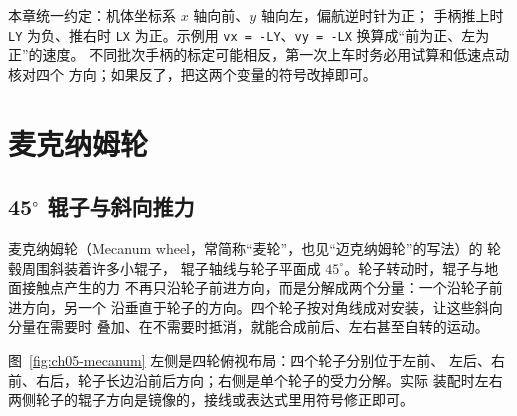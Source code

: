 本章统一约定：机体坐标系 $x$ 轴向前、$y$ 轴向左，偏航逆时针为正；
手柄推上时 \texttt{LY} 为负、推右时 \texttt{LX} 为正。示例用
\texttt{vx = -LY}、\texttt{vy = -LX} 换算成“前为正、左为正”的速度。
不同批次手柄的标定可能相反，第一次上车时务必用试算和低速点动核对四个
方向；如果反了，把这两个变量的符号改掉即可。

\section{麦克纳姆轮}

\subsection{45$^\circ$ 辊子与斜向推力}

麦克纳姆轮（Mecanum wheel，常简称“麦轮”，也见“迈克纳姆轮”的写法）的
轮毂周围斜装着许多小辊子，
辊子轴线与轮子平面成 $45^\circ$。轮子转动时，辊子与地面接触点产生的力
不再只沿轮子前进方向，而是分解成两个分量：一个沿轮子前进方向，另一个
沿垂直于轮子的方向。四个轮子按对角线成对安装，让这些斜向分量在需要时
叠加、在不需要时抵消，就能合成前后、左右甚至自转的运动。

图~\ref{fig:ch05-mecanum} 左侧是四轮俯视布局：四个轮子分别位于左前、
左后、右前、右后，轮子长边沿前后方向；右侧是单个轮子的受力分解。实际
装配时左右两侧轮子的辊子方向是镜像的，接线或表达式里用符号修正即可。

